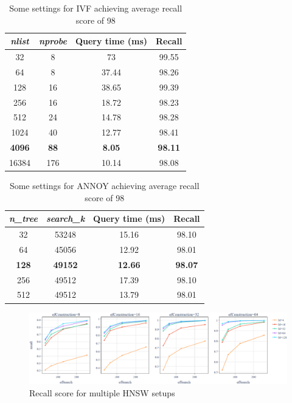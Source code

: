 \begin{table}[h!]
\centering
\begin{tabular}{c c c c}
\hline
\textit{nlist} & \textit{nprobe} & Query time (ms)  & Recall         \\ \hline
32 & 8 & 73 & 99.55 \\
64 & 8 & 37.44 & 98.26 \\
128 & 16 & 38.65 & 99.39 \\
256 & 16 & 18.72 & 98.23 \\
512 & 24 & 14.78 & 98.28 \\
1024 & 40 & 12.77 & 98.41 \\
\textbf{4096} & \textbf{88} & \textbf{8.05} & \textbf{98.11} \\
16384 & 176 & 10.14 & 98.08
\\ \hline
\end{tabular}
\caption{Some settings for IVF achieving average recall score of 98}
\label{table:chapter4-ivf}
\end{table}

\begin{table}[h!]
\centering
\begin{tabular}{c c c c}
\hline
\textit{n\_tree} & \textit{search\_k} & Query time (ms)  & Recall         \\ \hline
32 & 53248 & 15.16 & 98.10 \\
64 & 45056 & 12.92 & 98.01 \\
\textbf{128} & \textbf{49152} & \textbf{12.66} & \textbf{98.07} \\
256 & 49512 & 17.39 & 98.10 \\
512 & 49512 & 13.79 & 98.01 
\\ \hline
\end{tabular}
\caption{Some settings for ANNOY achieving average recall score of 98}
\label{table:chapter4-annoy}
\vspace{1cm}
\end{table}

\begin{figure}[h!]
    \centering
\includegraphics[width=\linewidth]{content/resources/images/fashion-recommendation/chapter4-hnsw-full.png}
    \caption{Recall score for multiple HNSW setups}
    \label{fig:chapter4-hnsw-full}
\end{figure}

